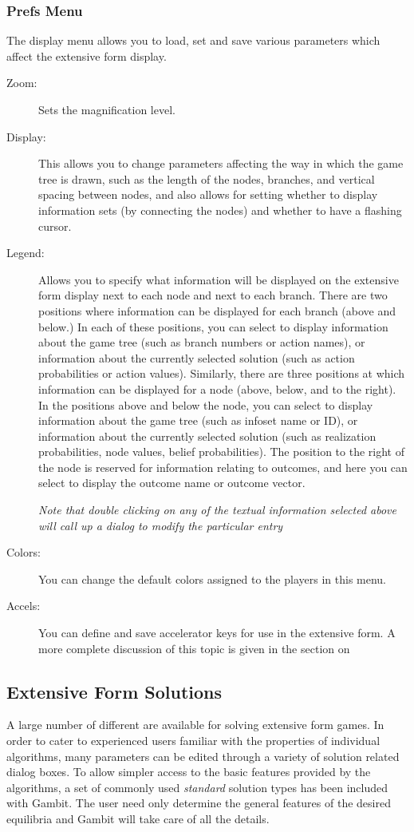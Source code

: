 {\subsubsection{Prefs Menu}\label{displaymenu}
The display menu allows you to load, set and save various parameters 
which affect the extensive form display.  
\begin{description}
\item[Zoom:]  Sets the magnification level.
\item[Display:] This allows you to change parameters affecting the way in which the 
game tree is drawn, such as the length of the nodes, branches, and 
vertical spacing between nodes, and also allows for setting whether to display 
information sets (by connecting the nodes) and whether to have a flashing cursor. 
\item[Legend:] Allows you to specify what information will be displayed on the 
extensive form display next to each node and next to each branch.  
There are two positions where information can be displayed for each branch 
(above and below.)   In each of these positions, you can select to display 
information about the game tree (such as branch numbers or action names), 
or information about the currently selected solution (such as action  
probabilities or action values).  
Similarly, there are three positions at which information can be displayed 
for a node (above, below, and to the right).  In the positions above and below 
the node, you can select to display 
information about the game tree (such as infoset name or ID), 
or information about the currently selected solution (such as realization 
probabilities, node values, belief probabilities). The position to the right of the node 
is reserved for information relating to outcomes, and here you can select to display 
the outcome name or outcome vector.  

{\em Note that double clicking on any of the textual information selected 
above will call up a dialog to modify the particular entry}
\item[Colors:] You can change the default colors assigned to the players in this 
menu. 
\item[Accels:]  You can define and save accelerator keys for use in the 
extensive form. A more complete discussion of this topic is given in the section 
on 
\end{description}

\subsection{Extensive Form Solutions}
A large number of different  are 
available for solving extensive form
games.  In order to cater to experienced users familiar with the 
properties of individual algorithms, many parameters can
be edited through a variety of solution related dialog boxes.  To allow 
simpler access to the basic features provided by the algorithms, a set of
commonly used {\em standard} solution types has been included with Gambit.
The user need only determine the general features of the desired equilibria
and Gambit will take care of all the details.

}
